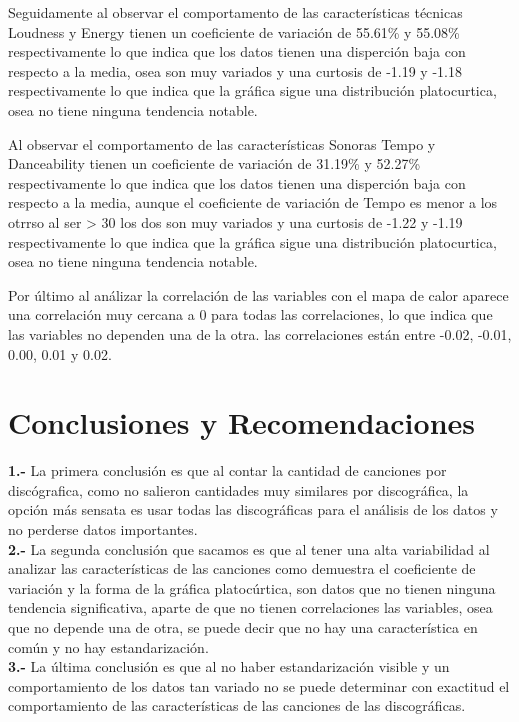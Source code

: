 \documentclass[oneside,11pt]{Latex/Classes/PhDthesisPSnPDF}
\begin{document}
Seguidamente al observar el comportamento de las características
técnicas Loudness y Energy tienen un coeficiente de variación de 55.61\%
y 55.08\% respectivamente lo que indica que los datos tienen una
disperción baja con respecto a la media, osea son muy variados y una
curtosis de -1.19 y -1.18 respectivamente lo que indica que la gráfica
sigue una distribución platocurtica, osea no tiene ninguna tendencia
notable.

Al observar el comportamento de las características Sonoras Tempo y
Danceability tienen un coeficiente de variación de 31.19\% y 52.27\%
respectivamente lo que indica que los datos tienen una disperción baja
con respecto a la media, aunque el coeficiente de variación de Tempo es
menor a los otrrso al ser \textgreater{} 30 los dos son muy variados y
una curtosis de -1.22 y -1.19 respectivamente lo que indica que la
gráfica sigue una distribución platocurtica, osea no tiene ninguna
tendencia notable.

Por último al análizar la correlación de las variables con el mapa de
calor aparece una correlación muy cercana a 0 para todas las
correlaciones, lo que indica que las variables no dependen una de la
otra. las correlaciones están entre -0.02, -0.01, 0.00, 0.01 y 0.02.

\chapter{Conclusiones y Recomendaciones}

\textbf{1.-} La primera conclusión es que al contar la cantidad de
canciones por discógrafica, como no salieron cantidades muy similares
por discográfica, la opción más sensata es usar todas las discográficas
para el análisis de los datos y no perderse datos importantes.\\

\textbf{2.-} La segunda conclusión que sacamos es que al tener una alta
variabilidad al analizar las características de las canciones como
demuestra el coeficiente de variación y la forma de la gráfica
platocúrtica, son datos que no tienen ninguna tendencia significativa,
aparte de que no tienen correlaciones las variables, osea que no depende
una de otra, se puede decir que no hay una característica en común y no
hay estandarización.\\

\textbf{3.-} La última conclusión es que al no haber estandarización
visible y un comportamiento de los datos tan variado no se puede
determinar con exactitud el comportamiento de las características de las
canciones de las discográficas.\\
\end{document}

